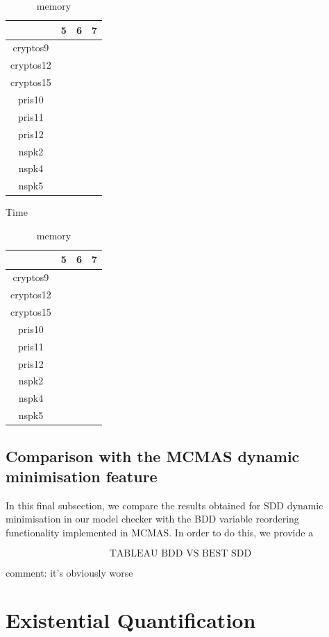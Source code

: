 \documentclass[11pt]{report}
\begin{document}
\begin{table}
\centering
\begin{tabular}{|*{4}{c|}}
\hline
 &5 & 6 & 7 \\ \hline
cryptos9 && &\\ \hline
cryptos12  &&  & \\ \hline
cryptos15   &&  & \\ \hline
pris10 &  && \\ \hline
pris11 & & & \\ \hline
pris12 & && \\ \hline
nspk2 & & & \\ \hline
nspk4 & && \\ \hline
nspk5 &&& \\ \hline
\end{tabular}
\caption{Time}
\label{table:newdaotime}
\vspace{1in}
\centering
\begin{tabular}{|*{4}{c|}}
\hline
& 5 & 6 & 7\\ \hline
cryptos9 & & & \\ \hline
cryptos12  &  && \\ \hline
cryptos15   &  && \\ \hline
pris10 &&  & \\ \hline
pris11 & & & \\ \hline
pris12 & && \\ \hline
nspk2 &  && \\ \hline
nspk4 & && \\ \hline
nspk5 &  && \\ \hline
\end{tabular}
\caption{memory}
\label{table:newdaomemory}
\end{table}

\subsection{Comparison with the MCMAS dynamic minimisation feature} 
\label{daocomparison}

In this final subsection, we compare the results obtained for SDD dynamic minimisation in our model checker with the BDD variable reordering functionality implemented in MCMAS. In order to do this, we provide a

$$\mbox{TABLEAU BDD VS BEST SDD}$$

comment: it's obviously worse 

\section{Existential Quantification}
\end{document}
